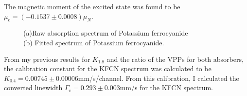 \documentclass[a4paper, twocolumn]{article}
\begin{document}
The magnetic moment of the excited state was found to be $\mu_e = (-0.1537\pm0.0008)\mu_N$.
\begin{figure}[!htbp]
\centering
{}
\caption{(a)Raw absorption spectrum of Potassium ferrocyanide\\ 
(b) Fitted spectrum of Potassium ferrocyanide.
}
\end{figure}
From my previous results for $K_{1.8}$ and the ratio of the VPPs for both absorbers, the calibration constant for the KFCN spectrum was calculated to be $K_{0.4} = 0.00745\pm0.00006$mm/s/channel.
From this calibration, I calculated the converted linewidth $\Gamma_v = 0.293\pm0.003$mm/s for the KFCN spectrum.
\end{document}
